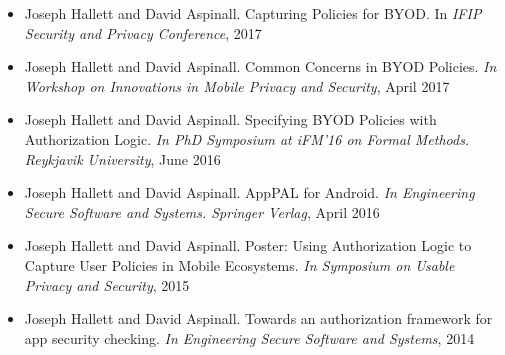 \documentclass[thesis.tex]{subfiles}
\begin{document}
\begin{itemize}
\item 
Joseph Hallett and David Aspinall. Capturing Policies for BYOD. In \emph{IFIP Security and Privacy Conference}, 2017
\item Joseph Hallett and David Aspinall. Common Concerns in BYOD Policies. \emph{In Workshop on Innovations in Mobile Privacy and Security}, April 2017
\item Joseph Hallett and David Aspinall. Specifying BYOD Policies with Authorization Logic. \emph{In PhD Symposium at iFM'16 on Formal Methods. Reykjavik University}, June 2016
\item Joseph Hallett and David Aspinall. AppPAL for Android. \emph{In Engineering Secure Software and Systems. Springer Verlag}, April 2016
\item Joseph Hallett and David Aspinall. Poster: Using Authorization Logic to Capture User Policies in Mobile Ecosystems. \emph{In Symposium on Usable Privacy and Security}, 2015
\item Joseph Hallett and David Aspinall. Towards an authorization framework for app security checking. \emph{In Engineering Secure Software and Systems}, 2014
\end{itemize}
\end{document}
